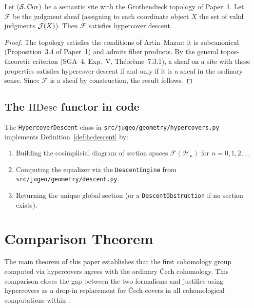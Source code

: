 \documentclass[11pt]{article}
\newcommand{\HC}{\mathcal{H}}              %
\newcommand{\HypDescent}{\mathrm{HDesc}}  %
\begin{document}
\begin{theorem}\label{thm:hcdescent}
  Let $(\mathcal{S}, \mathrm{Cov})$ be a \JuGeo{} semantic site with the Grothendieck
  topology of Paper~1.  Let $\mathcal{F}$ be the judgment sheaf
  (assigning to each coordinate object $X$ the set of valid judgments
  $\mathcal{J}(X)$).  Then $\mathcal{F}$ satisfies hypercover descent.
\end{theorem}

\begin{proof}
  The \JuGeo{} topology satisfies the conditions of Artin--Mazur:
  it is subcanonical (Proposition~3.4 of Paper~1) and admits fiber
  products.  By the general topos-theoretic criterion
  (SGA~4, Exp.~V, Théorème~7.3.1), a sheaf on a site with these
  properties satisfies hypercover descent if and only if it is a
  sheaf in the ordinary sense.  Since $\mathcal{F}$ is a sheaf by
  construction, the result follows.
\end{proof}

\subsection{The \texorpdfstring{$\HypDescent$}{HDesc} functor in code}

The \texttt{HypercoverDescent} class in
\texttt{src/jugeo/geometry/hypercovers.py} implements
Definition~\ref{def:hcdescent} by:
\begin{enumerate}
  \item Building the cosimplicial diagram of section spaces
    $\mathcal{F}(\HC_n)$ for $n = 0, 1, 2, \ldots$
  \item Computing the equalizer via the \texttt{DescentEngine}
    from \texttt{src/jugeo/geometry/descent.py}.
  \item Returning the unique global section (or a
    \texttt{DescentObstruction} if no section exists).
\end{enumerate}

\section{Comparison Theorem}\label{sec:comparison}

The main theorem of this paper establishes that the first cohomology
group computed via hypercovers agrees with the ordinary Čech
cohomology.  This comparison closes the gap between the two formalisms
and justifies using hypercovers as a drop-in replacement for Čech
covers in all cohomological computations within \JuGeo{}.
\end{document}
